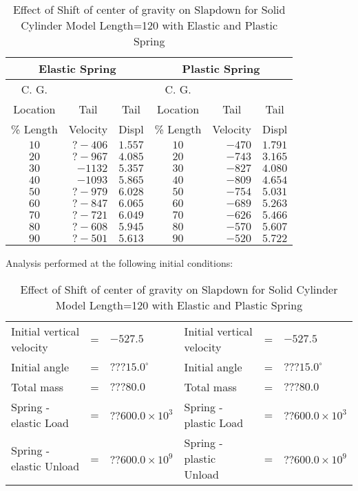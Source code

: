 \begin{table}
\begin{center}
\caption{Effect of Shift of center of gravity on Slapdown for Solid
Cylinder Model Length=120 with Elastic and Plastic Spring}
\makeqnum
\begin{tabular}{||c|r|r|c|r|r||}
\hline
\multicolumn{3}{||c|}{Elastic Spring} &\multicolumn{3}{c||}{Plastic 
Spring}\\
\hline
\multicolumn{1}{||c|}{C. G.}
&  &
&\multicolumn{1}{c|}{C. G.}
& &\\
\multicolumn{1}{||c|}{Location}
&\multicolumn{1}{c|}{Tail}
&\multicolumn{1}{c|}{Tail}
&\multicolumn{1}{c|}{Location}
&\multicolumn{1}{c|}{Tail}
&\multicolumn{1}{c||}{Tail}\\
\multicolumn{1}{||c|}{\% Length}
&\multicolumn{1}{c|}{Velocity}
&\multicolumn{1}{c|}{Displ}
&\multicolumn{1}{c|}{\% Length}
&\multicolumn{1}{c|}{Velocity}
&\multicolumn{1}{c||}{Displ}\\
$10$ &$?-406$ &$1.557$ &$10$ &$-470$ &$1.791$\\
$20$ &$?-967$ &$4.085$ &$20$ &$-743$ &$3.165$\\
$30$ &$-1132$ &$5.357$ &$30$ &$-827$ &$4.080$\\
$40$ &$-1093$ &$5.865$ &$40$ &$-809$ &$4.654$\\
$50$ &$?-979$ &$6.028$ &$50$ &$-754$ &$5.031$\\
$60$ &$?-847$ &$6.065$ &$60$ &$-689$ &$5.263$\\
$70$ &$?-721$ &$6.049$ &$70$ &$-626$ &$5.466$\\
$80$ &$?-608$ &$5.945$ &$80$ &$-570$ &$5.607$\\
$90$ &$?-501$ &$5.613$ &$90$ &$-520$ &$5.722$\\
\hline
\end{tabular}
\end{center}

Analysis performed at the following initial conditions:

\makeqnum
\begin{tabular}{llllll}
Initial vertical velocity &= &$-527.5$
&Initial vertical velocity &= &$-527.5$\\
Initial angle &= &$???15.0^\circ$ &Initial angle &= &$???15.0^\circ$\\
Total mass &= &$???80.0$ &Total mass &= &$???80.0$\\
Spring - elastic     Load &=  &$??600.0\times10^3$
&Spring - plastic     Load &= &$??600.0\times10^3$\\
Spring - elastic   Unload &= &$??600.0\times10^9$
&Spring - plastic   Unload &= &$??600.0\times10^9$\\
\end{tabular}
\end{table}

